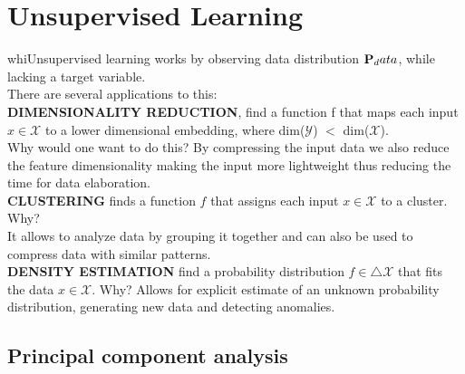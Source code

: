 \chapter{Unsupervised Learning}
whiUnsupervised learning works by observing data distribution ${\bf P}_data$,  while lacking a target variable.\\
There are several applications to this: \\
{\bf DIMENSIONALITY REDUCTION}, find a function f that maps each input $x \in \mathscr{X}$ to a lower dimensional embedding, where dim($\mathscr{Y}$) $ < $ dim($\mathscr{X}$). \\
Why would one want to do this? By compressing the input data we also reduce the feature dimensionality making the input more lightweight thus reducing the time for data elaboration.\\
{\bf CLUSTERING} finds a function $f$ that assigns each input $x \in \mathscr{X}$ to a cluster. Why? \\
It allows to analyze data by grouping it together and can also be used to compress data with similar patterns.\\
{\bf DENSITY ESTIMATION} find a probability distribution $f \in \triangle \mathscr{X}$ that fits the data $x \in \mathscr{X}$. Why? 
Allows for explicit estimate of an unknown probability distribution, generating new data and detecting anomalies.\\
\section{Principal component analysis}
